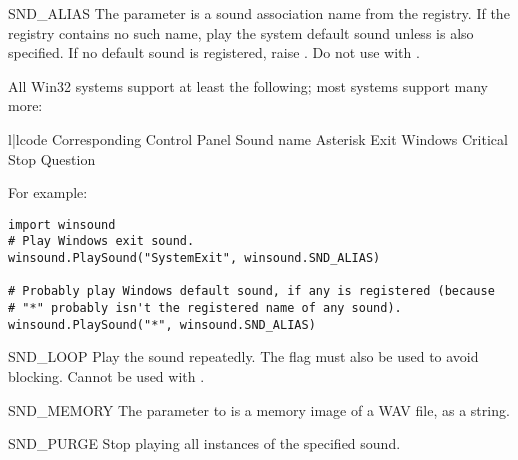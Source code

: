 \begin{datadesc}{SND_ALIAS}
  The  parameter is a sound association name from the
  registry.  If the registry contains no such name, play the system
  default sound unless  is also specified.
  If no default sound is registered, raise .
  Do not use with .

  All Win32 systems support at least the following; most systems support
  many more:

\begin{tableii}{l|l}{code}
               { }
               {Corresponding Control Panel Sound name}
     {Asterisk}
         {Exit Windows}
         {Critical Stop}
     {Question}
\end{tableii}

  For example:

\begin{verbatim}
import winsound
# Play Windows exit sound.
winsound.PlaySound("SystemExit", winsound.SND_ALIAS)

# Probably play Windows default sound, if any is registered (because
# "*" probably isn't the registered name of any sound).
winsound.PlaySound("*", winsound.SND_ALIAS)
\end{verbatim}
\end{datadesc}

\begin{datadesc}{SND_LOOP}
  Play the sound repeatedly.  The  flag must also
  be used to avoid blocking.  Cannot be used with .
\end{datadesc}

\begin{datadesc}{SND_MEMORY}
  The  parameter to  is a memory
  image of a WAV file, as a string.

\end{datadesc}

\begin{datadesc}{SND_PURGE}
  Stop playing all instances of the specified sound.
\end{datadesc}

